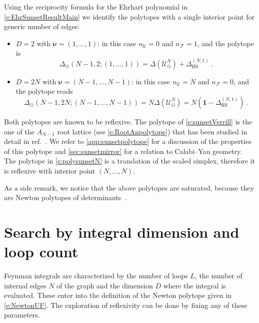 \documentclass[12pt,a4paper]{article}
\theoremstyle{plain}
\theoremstyle{remark}
\newcommand{\nprops}{N}
\newcommand{\cU}{\mathscr {U}}
\newcommand{\cF}{\mathscr {F}}
\newcommand{\undernotation}[1]{\pmb{#1}}
\newcommand{\Newton}{\Delta}
\newcommand{\simplexwithpars}[1]{\Newton_{\text{HS}}^{(#1)}}
\begin{document}
Using the reciprocity formula for the Ehrhart polynomial in \cref{e:EhrSunsetResultMain} we identify the polytopes with a single interior point for generic number of edges:
\begin{itemize}
\item {$D=2$ with $\undernotation{\nu}=(1,\dots,1)$:}  in this case
  $n_\cU=0$ and $n_\cF=1$, and the polytope is
  \begin{equation}\label{e:sunsetVerrill}
    \Delta_{\circleddash}(\nprops-1,2;(1,\dots,1))=\Newton(	\cU^{\nprops}_{\circleddash})+\simplexwithpars{\nprops,1}\,.
  \end{equation}
 
		
\item {$D=2\nprops$ with $\undernotation{\nu}=(\nprops-1,\dots,\nprops-1)$:}
in this case $n_\cU=\nprops$ and $n_\cF=0$, and the polytope reads
  \begin{equation}\label{e:polysunsetN}
    \Delta_{\circleddash}(\nprops-1,2\nprops;(\nprops-1,\dots,\nprops-1))=\nprops\Newton(	\cU^{\nprops}_{\circleddash})=\nprops\left(\mathbf{1}-\simplexwithpars{\nprops,1}\right)\,.
  \end{equation}
\end{itemize}

Both polytopes are known to be reflexive. The polytope of \cref{e:sunsetVerrill} is the one of the $A_{\nprops-1}$ root lattice (see \cref{e:RootAnpolytope}) that 
  has been studied in detail in ref.~\cite{verrill1996root}. 	%
  We refer to \cref{app:sunsetpolytope} for a discussion of the properties of this polytope  and \cref{sec:sunsetmirror} for a relation to Calabi--Yau geometry.  The polytope in \cref{e:polysunsetN} is a translation of the scaled simplex, therefore it is reflexive with interior point $(N,\dots,N)$.

As a side remark, we notice that the above  polytopes are saturated, because they are Newton polytopes of
determinants~\cite{Cara:2019}.


\section{Search by integral dimension and loop count}
\label{sec:dimloopscan}

 Feynman integrals are characterized by the number of
 loops $L$, the number of internal edges $\nprops$ of
 the graph and the dimension $D$ where the integral is
 evaluated.  These enter into the definition of the
 Newton polytope given in \cref{e:NewtonUF}. The
 exploration of reflexivity can be done by fixing any
 of these parameters.
 
\end{document}
